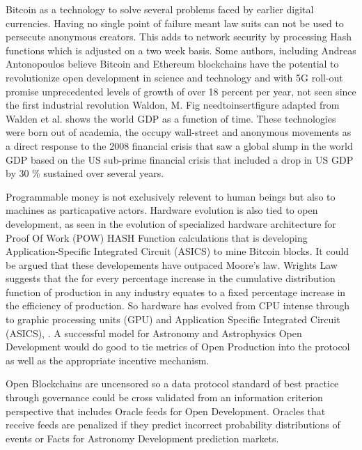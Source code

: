 \documentclass[final,5p,times,twocolumn,authoryear]{elsarticle}
\begin{document}
Bitcoin as a technology to solve several problems faced by earlier digital currencies. Having no single point of failure meant law suits can not be used to persecute anonymous creators. This adds to network security by processing Hash functions which is adjusted on a two week basis. Some authors, including Andreas Antonopoulos believe Bitcoin and Ethereum blockchains have the potential to revolutionize open development in science and technology and with 5G roll-out promise unprecedented levels of growth of over 18 percent per year, not seen since the first industrial revolution Waldon, M.  Fig needtoinsertfigure adapted from Walden et al. shows the world GDP as a function of time. These technologies were born out of academia, the occupy wall-street and anonymous movements as a direct response to the 2008 financial crisis that saw a global slump in the world GDP based on the US sub-prime financial crisis  that included a drop in US GDP by 30 \% sustained over several years.
 
Programmable money is not exclusively relevent to human beings but also to machines as particapative actors. Hardware evolution is also tied to open development, as seen in the evolution of specialized hardware architecture for Proof Of Work (POW) HASH Function calculations that is developing Application-Specific Integrated Circuit (ASICS) to mine Bitcoin blocks. It could be argued that these developements have outpaced Moore's law.  Wrights Law suggests that the for every percentage increase in the cumulative distribution function of production in any industry equates to a fixed percentage increase in the efficiency of production. So hardware has evolved from CPU intense through to graphic processing units (GPU) and  Application Specific Integrated Circuit  (ASICS), \cite{10.1371/journal.pone.0052669}. A successful model for Astronomy and Astrophysics Open Development would do good to tie metrics of Open Production into the protocol as well as the appropriate incentive mechanism.       

Open Blockchains are uncensored so a data protocol standard of best practice through governance could be cross validated from an information criterion perspective that includes Oracle feeds for Open Development.  Oracles that receive feeds are penalized if they predict incorrect probability distributions of events or Facts for Astronomy Development prediction markets. 
\end{document}
